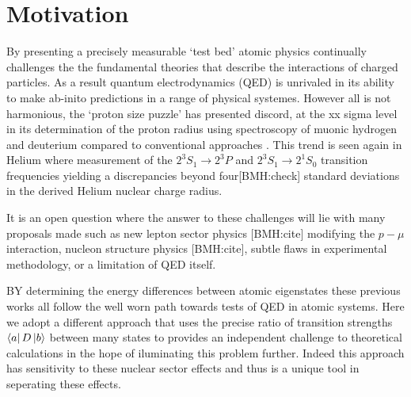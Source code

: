 \documentclass[aps,prl,
,reprint,
superscriptaddress,
onecolumn,
showpacs,preprintnumbers,
 amsmath,amssymb,
]{revtex4-1}
\newcommand{\MetastableState}{2^{3\!}S_1}%
\newcommand{\LowerStateManifold}{2^{3\!}P}%
\newcommand{\SingletState}{2^{1\!}S_0}%
\newcommand{\brycerev}[1]{{\color{Purple}{#1}\normalcolor}} %
\newcommand{\brycecom}[1]{{\color{ProcessBlue}[BMH:{#1}]\normalcolor}} %
\begin{document}
\clearpage

\section{Motivation}
By presenting a precisely measurable `test bed' atomic physics continually challenges the the fundamental theories that describe the interactions of charged particles. As a result quantum electrodynamics (QED) is unrivaled in its ability to make ab-inito predictions in a range of physical systemes.  However all is not harmonious, the `proton size puzzle' has presented discord, at the xx sigma level in its determination of the proton radius using spectroscopy of muonic hydrogen and deuterium compared to conventional approaches \cite{Pohl2010,Pohl669,Bezginov1007}. 
This trend is seen again in Helium where 
measurement of the \(\MetastableState \rightarrow \LowerStateManifold\) 
\cite{PhysRevLett.74.3553,PhysRevLett.108.143001,PhysRevLett.119.263002} and
\(\MetastableState \rightarrow \SingletState \) \cite{vanRooij196,Rengelink2018} transition frequencies yielding a discrepancies beyond four\brycecom{check} standard deviations in the derived Helium nuclear charge radius.

It is an open question where the answer to these challenges will lie with many proposals made such as new lepton sector physics \brycecom{cite} modifying the \(p-\mu\) interaction, nucleon structure physics \brycecom{cite}, subtle flaws in experimental methodology, or a limitation of QED itself.

BY determining the energy differences between atomic eigenstates these previous works all follow the well worn path towards tests of QED in atomic systems. Here we adopt a different approach that uses the precise ratio of transition strengths\(\bra{a}D\ket{b}\) between many states to provides an independent challenge to theoretical calculations in the hope of iluminating this problem further. Indeed this approach has \brycerev{greater/less} sensitivity to these nuclear sector effects and thus is a unique tool in seperating these effects.
\end{document}
